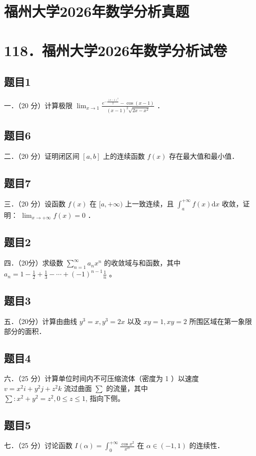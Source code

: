 \documentclass{article}
\begin{document}
\section*{福州大学2026年数学分析真题}
\section*{118．福州大学2026年数学分析试卷}

\subsection{题目1}
一．（20 分）计算极限 \(\lim _{x \rightarrow 1} \frac{e^{-\frac{(x-1)^{2}}{2}}-\cos (x-1)}{(x-1)^{2} \sqrt{2 x-x^{2}}}\) ．

\subsection{题目6}
二．（20 分）证明闭区间 \([a, b]\) 上的连续函数 \(f(x)\) 存在最大值和最小值．

\subsection{题目7}
三．（20 分）设函数 \(f(x)\) 在 \([a,+\infty)\) 上一致连续，且 \(\int_{a}^{+\infty} f(x) \mathrm{d} x\) 收敛，证明： \(\lim _{x \rightarrow+\infty} f(x)=0\) ．

\subsection{题目2}
四．（20分）求级数 \(\sum_{n=1}^{\infty} a_{n} x^{n}\) 的收敛域与和函数，其中 \(a_{n}=1-\frac{1}{2}+\frac{1}{3}-\cdots+(-1)^{n-1} \frac{1}{n}\) 。

\subsection{题目3}
五．（20分）计算由曲线 \(y^{3}=x, y^{3}=2 x\) 以及 \(x y=1, x y=2\) 所围区域在第一象限部分的面积．

\subsection{题目4}
六．（25 分）计算单位时间内不可压缩流体（密度为 1 ）以速度 \(v=x^{2} i+y^{2} j+z^{2} k\) 流过曲面 \(\sum\) 的流量，其中\\
\(\sum: x^{2}+y^{2}=z^{2}, 0 \leq z \leq 1\), 指向下侧。

\subsection{题目5}
七．（25 分）讨论函数 \(I(\alpha)=\int_{0}^{+\infty} \frac{\cos x^{2}}{x^{\alpha}}\) 在 \(\alpha \in(-1,1)\) 的连续性．
\end{document}
